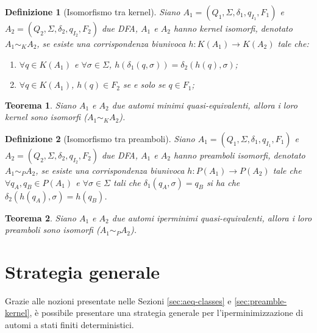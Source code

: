 \documentclass[a4paper,12pt]{report} %
\newtheorem{theorem}{Teorema}[chapter]        %
\newtheorem{definition}{Definizione}[chapter] %
\begin{document}
\begin{definition}[Isomorfismo tra kernel]\label{def:kernel-isomorphism}
  Siano $A_1 = (Q_1, \Sigma, \delta_1, q_{I_1}, F_1)$ e $A_2 = (Q_2, \Sigma, \delta_2, q_{I_2}, F_2)$ due DFA,
  $A_1$ e $A_2$ hanno kernel isomorfi, denotato $A_1 \sim_K A_2$,
  se esiste una corrispondenza biunivoca $h: K(A_1) \rightarrow K(A_2)$ tale che:
  \begin{enumerate}[label=(\alph*)]
    \item $\forall q \in K(A_1)$ e $\forall \sigma \in \Sigma$, $h(\delta_1(q, \sigma))
    = \delta_2(h(q), \sigma)$;
    \item $\forall q \in K(A_1)$, $h(q) \in F_2$ se e solo se $q \in F_1$;
  \end{enumerate}
\end{definition}

\begin{theorem}\label{th:kernel-isomorphism}
  Siano $A_1$ e $A_2$ due automi minimi quasi-equivalenti, allora i loro kernel sono isomorfi ($A_1 \sim_K A_2$).
\end{theorem}

\begin{definition}[Isomorfismo tra preamboli]\label{def:preamble-isomorphism}
  Siano $A_1 = (Q_1, \Sigma, \delta_1, q_{I_1}, F_1)$ e $A_2 = (Q_2, \Sigma, \delta_2, q_{I_2}, F_2)$ due DFA,
  $A_1$ e $A_2$ hanno preamboli isomorfi, denotato $A_1 \sim_P A_2$,
  se esiste una corrispondenza biunivoca $h: P(A_1) \rightarrow P(A_2)$ tale che 
  $\forall q_{A}, q_{B} \in P(A_1)$ e $\forall \sigma \in \Sigma$ tali che $\delta_1(q_{A}, \sigma) = q_{B}$
  si ha che $\delta_2(h(q_{A}), \sigma) = h(q_{B})$.
\end{definition}

\begin{theorem}\label{th:preamble-isomorphism}
  Siano $A_1$ e $A_2$ due automi iperminimi quasi-equivalenti, allora i loro preamboli sono isomorfi ($A_1 \sim_P A_2$).
\end{theorem}

\section{Strategia generale}
\label{sec:hyperminimization-strategy}

Grazie alle nozioni presentate nelle Sezioni \ref{sec:aeq-classes} e \ref{sec:preamble-kernel}, è possibile
presentare una strategia generale per l'iperminimizzazione di automi a stati finiti deterministici.
\end{document}
